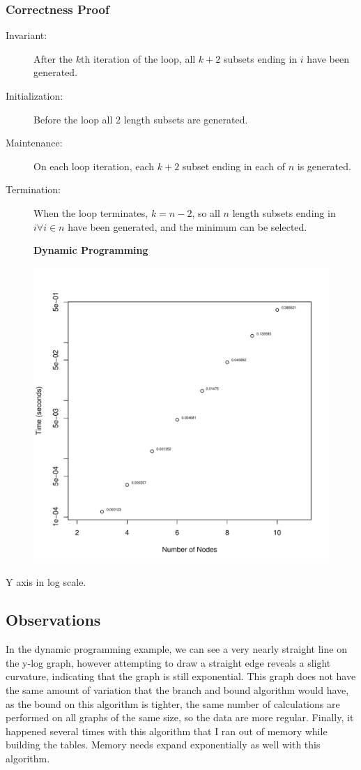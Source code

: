 \documentclass[a4paper,12pt]{article}
\begin{document}
\subsubsection{Correctness Proof}
\begin{description}
\item [Invariant: ] After the $k$th iteration of the loop, all $k + 2$ subsets ending in $i$ have been generated.
\item [Initialization: ] Before the loop all 2 length subsets are generated.
\item [Maintenance: ] On each loop iteration, each $k + 2$ subset ending in each of $n$ is generated.
\item [Termination: ] When the loop terminates, $k = n - 2$, so all $n$ length subsets ending in $i  \forall  i  \in  n$ have been generated, and the minimum can be selected.
\end{description}
\begin{figure}[H]
  \centering
  \textbf{Dynamic Programming}\par\medskip
  \includegraphics[width=1\linewidth]{DynamicProgramming.pdf}
\end{figure}
Y axis in log scale.
\subsection{Observations}
In the dynamic programming example, we can see a very nearly straight line on the y-log graph, however attempting to draw a straight edge reveals a slight curvature, indicating that the graph is still exponential. This graph does not have the same amount of variation that the branch and bound algorithm would have, as the bound on this algorithm is tighter, the same number of calculations are performed on all graphs of the same size, so the data are more regular. Finally, it happened several times with this algorithm that I ran out of memory while building the tables. Memory needs expand exponentially as well with this algorithm.
\end{document}
